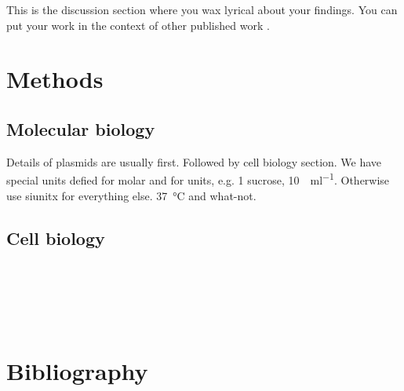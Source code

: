 \documentclass[submit]{theme/bioRxiv}
\begin{document}
This is the discussion section where you wax lyrical about your findings.
You can put your work in the context of other published work \citep{brenner_uga:_1967}.

\lipsum[100-104]

\section*{Methods}\label{s:methods}

\subsection*{Molecular biology}

Details of plasmids are usually first.
Followed by cell biology section.
We have special units defied for molar and for units, e.g. \SI{1}{\Molar} sucrose, \SI{10}{\Units\per\milli\litre}.
Otherwise use siunitx for everything else. \SI{37}{\degreeCelsius} and what-not.

\subsection*{Cell biology}

\lipsum[80]

\\

\\

\\

\\

\section*{Bibliography}



\end{document}
